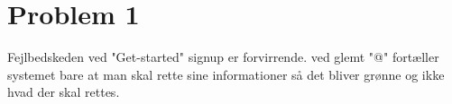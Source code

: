 \documentclass[12pt]{article}
\begin{document}

\clearpage\maketitle
\thispagestyle{empty}

\newpage

\thispagestyle{empty}

\newpage
\pagestyle{plain}
\setcounter{page}{1}

\section*{Problem 1}
Fejlbedskeden ved "Get-started" signup er forvirrende. ved glemt "@" fortæller systemet bare at man skal rette sine informationer så det bliver grønne og ikke hvad der skal rettes.
\newpage
\end{document}
